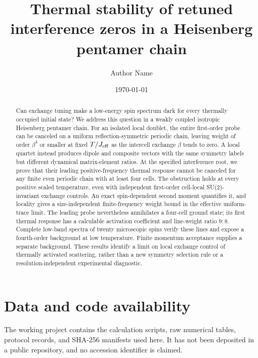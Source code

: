 \documentclass[aps,prb,reprint,amsmath,amssymb,superscriptaddress,longbibliography,nofootinbib,floatfix]{revtex4-2}
\begin{document}
\raggedbottom
\title{Thermal stability of retuned interference zeros in a Heisenberg pentamer chain}
\author{Author Name}
\date{\today}
\begin{abstract}
Can exchange tuning make a low-energy spin spectrum dark for every
thermally occupied initial state? We address this question in a weakly
coupled isotropic Heisenberg pentamer chain. For an isolated local
doublet, the entire first-order probe can be canceled on a uniform
reflection-symmetric periodic chain, leaving weight of order $\beta^4$
or smaller at fixed $T/J_{\rm eff}$ as the intercell exchange $\beta$
tends to zero. A local quartet instead produces dipole and composite
vectors with the same symmetry labels but different dynamical
matrix-element ratios. At the specified interference root, we prove
that their leading positive-frequency thermal response cannot be
canceled for any finite even periodic chain with at least four cells.
The obstruction holds at every positive scaled temperature, even with
independent first-order cell-local SU(2)-invariant exchange controls.
An exact spin-dependent second moment quantifies it, and locality gives
a size-independent finite-frequency weight bound in the effective
uniform-trace limit. The leading probe nevertheless annihilates a
four-cell ground state; its first thermal response has a calculable activation coefficient
and line-weight ratio $9:8$. Complete low-band spectra of twenty
microscopic spins verify these lines and expose a fourth-order
background at low temperature. Finite momentum acceptance supplies a
separate background. These results identify a limit on local exchange
control of thermally activated scattering, rather than a new symmetry
selection rule or a resolution-independent experimental diagnostic.
\end{abstract}
\maketitle





\begin{acknowledgments}
\end{acknowledgments}
\section*{Data and code availability}
The working project contains the calculation scripts, raw numerical tables,
protocol records, and SHA-256 manifests used here. It has not been deposited in
a public repository, and no accession identifier is claimed.
\appendix





\end{document}

